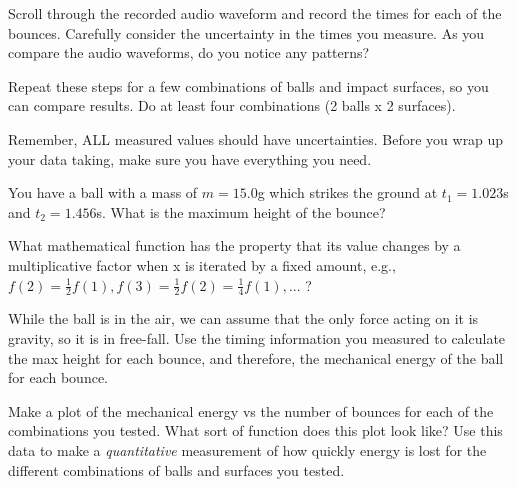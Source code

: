 Scroll through the recorded audio waveform and record the times for each of the bounces. Carefully consider the uncertainty in the times you measure.  As you compare the audio waveforms, do you notice any patterns?

Repeat these steps for a few combinations of balls and impact surfaces, so you can compare results. Do at least four combinations (2 balls x 2 surfaces).

\selfcheck

Remember, ALL measured values should have uncertainties. Before you wrap up your data taking, make sure you have everything you need.

\prelab

\prelabquestion
You have a ball with a mass of $m=15.0$g which strikes the ground at $t_1=1.023$s and $t_2=1.456$s. What is the maximum height of the bounce?

\prelabquestion
What mathematical function has the property that its value changes by a multiplicative factor when x is iterated by a fixed amount, e.g., $f(2)=\frac{1}{2}f(1) , f(3)=\frac{1}{2}f(2)=\frac{1}{4}f(1), ...$ ?

\analysis

While the ball is in the air, we can assume that the only force acting on it is gravity, so it is in free-fall.  Use the timing information you measured to calculate the max height for each bounce, and therefore, the mechanical energy of the ball for each bounce.

Make a plot of the mechanical energy vs the number of bounces for each of the combinations you tested.  What sort of function does this plot look like? Use this data to make a \emph{quantitative} measurement of how quickly energy is lost for the different combinations of balls and surfaces you tested.

